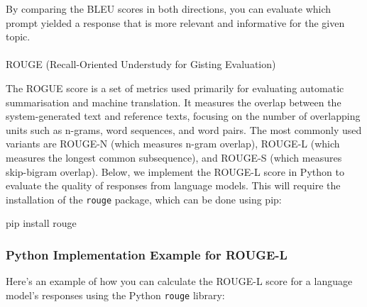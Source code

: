 \documentclass[
]{agujournal2019}
\makeatletter
\let\oldparagraph\paragraph
\renewcommand{\paragraph}{
    \@ifstar
      \xxxParagraphStar
      \xxxParagraphNoStar
  }
\newcommand{\xxxParagraphStar}[1]{\oldparagraph*{#1}\mbox{}}
\newcommand{\xxxParagraphNoStar}[1]{\oldparagraph{#1}\mbox{}}
\newenvironment{Shaded}{\begin{snugshade}}{\end{snugshade}}
\newcommand{\ExtensionTok}[1]{\textcolor[rgb]{0.00,0.23,0.31}{#1}}
\newcommand{\NormalTok}[1]{\textcolor[rgb]{0.00,0.23,0.31}{#1}}
\makeatother
\begin{document}
By comparing the BLEU scores in both directions, you can evaluate which
prompt yielded a response that is more relevant and informative for the
given topic.

\paragraph{ROUGE (Recall-Oriented Understudy for Gisting
Evaluation)}\label{rouge-recall-oriented-understudy-for-gisting-evaluation}

The ROGUE score is a set of metrics used primarily for evaluating
automatic summarisation and machine translation. It measures the overlap
between the system-generated text and reference texts, focusing on the
number of overlapping units such as n-grams, word sequences, and word
pairs. The most commonly used variants are ROUGE-N (which measures
n-gram overlap), ROUGE-L (which measures the longest common
subsequence), and ROUGE-S (which measures skip-bigram overlap). Below,
we implement the ROUGE-L score in Python to evaluate the quality of
responses from language models. This will require the installation of
the \texttt{rouge} package, which can be done using pip:

\begin{Shaded}
\begin{Highlighting}[]
\ExtensionTok{pip}\NormalTok{ install rouge}
\end{Highlighting}
\end{Shaded}

\subsubsection{Python Implementation Example for
ROUGE-L}\label{python-implementation-example-for-rouge-l}

Here's an example of how you can calculate the ROUGE-L score for a
language model's responses using the Python \texttt{rouge} library:
\end{document}
